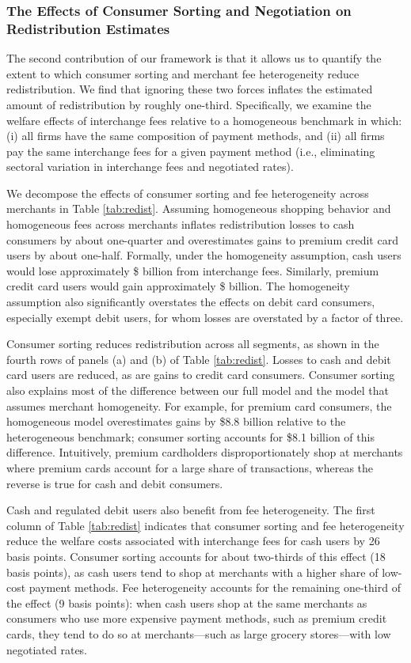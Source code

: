 \documentclass[main.tex]{subfiles}
\begin{document}
\subsubsection{The Effects of Consumer Sorting and Negotiation on Redistribution Estimates}

The second contribution of our framework is that it allows us to quantify the extent to which consumer sorting and merchant fee heterogeneity reduce redistribution. We find that ignoring these two forces inflates the estimated amount of redistribution by roughly one-third. Specifically, we examine the welfare effects of interchange fees relative to a homogeneous benchmark in which: (i) all firms have the same composition of payment methods, and (ii) all firms pay the same interchange fees for a given payment method (i.e., eliminating sectoral variation in interchange fees and negotiated rates).

We decompose the effects of consumer sorting and fee heterogeneity across merchants in Table \ref{tab:redist}. Assuming homogeneous shopping behavior and homogeneous fees across merchants inflates redistribution losses to cash consumers by about one-quarter and overestimates gains to premium credit card users by about one-half. Formally, under the homogeneity assumption, cash users would lose approximately \$ billion from interchange fees. Similarly, premium credit card users would gain approximately \$ billion. The homogeneity assumption also significantly overstates the effects on debit card consumers, especially exempt debit users, for whom losses are overstated by a factor of three.

Consumer sorting reduces redistribution across all segments, as shown in the fourth rows of panels (a) and (b) of Table \ref{tab:redist}. Losses to cash and debit card users are reduced, as are gains to credit card consumers. Consumer sorting also explains most of the difference between our full model and the model that assumes merchant homogeneity. For example, for premium card consumers, the homogeneous model overestimates gains by \$8.8 billion relative to the heterogeneous benchmark; consumer sorting accounts for \$8.1 billion of this difference. Intuitively, premium cardholders disproportionately shop at merchants where premium cards account for a large share of transactions, whereas the reverse is true for cash and debit consumers.

Cash and regulated debit users also benefit from fee heterogeneity. The first column of Table \ref{tab:redist} indicates that consumer sorting and fee heterogeneity reduce the welfare costs associated with interchange fees for cash users by 26 basis points. Consumer sorting accounts for about two-thirds of this effect (18 basis points), as cash users tend to shop at merchants with a higher share of low-cost payment methods. Fee heterogeneity accounts for the remaining one-third of the effect (9 basis points): when cash users shop at the same merchants as consumers who use more expensive payment methods, such as premium credit cards, they tend to do so at merchants---such as large grocery stores---with low negotiated rates. 
\end{document}
